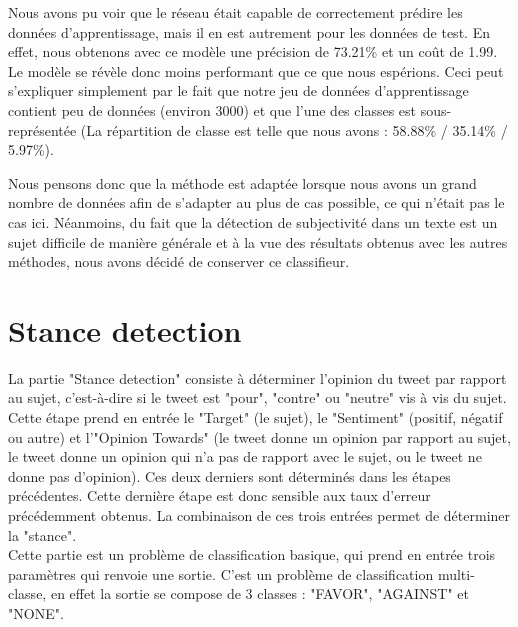 \par Nous avons pu voir que le réseau était capable de correctement prédire les données d'apprentissage, mais il en est autrement pour les données de test. En effet, nous obtenons avec ce modèle une précision de 73.21\% et un coût de 1.99. Le modèle se révèle donc moins performant que ce que nous espérions. Ceci peut s'expliquer simplement par le fait que notre jeu de données d'apprentissage contient peu de données (environ 3000) et que l'une des classes est sous-représentée (La répartition de classe est telle que nous avons : 58.88\% / 35.14\% / 5.97\%).

\par Nous pensons donc que la méthode est adaptée lorsque nous avons un grand nombre de données afin de s'adapter au plus de cas possible, ce qui n'était pas le cas ici. Néanmoins, du fait que la détection de subjectivité dans un texte est un sujet difficile de manière générale et à la vue des résultats obtenus avec les autres méthodes, nous avons décidé de conserver ce classifieur.


\section{Stance detection}

La partie "Stance detection" consiste à déterminer l'opinion du tweet par rapport au sujet, c'est-à-dire si le tweet est "pour", "contre" ou "neutre" vis à vis du sujet. Cette étape prend en entrée le "Target" (le sujet), le "Sentiment" (positif, négatif ou autre) et l'"Opinion Towards" (le tweet donne un opinion par rapport au sujet, le tweet donne un opinion qui n'a pas de rapport avec le sujet, ou le tweet ne donne pas d'opinion). Ces deux derniers sont déterminés dans les étapes précédentes. Cette dernière étape est donc sensible aux taux d'erreur précédemment obtenus.
La combinaison de ces trois entrées permet de déterminer la "stance". \\

Cette partie est un problème de classification basique, qui prend en entrée trois paramètres qui renvoie une sortie. C'est un problème de classification multi-classe, en effet la sortie se compose de 3 classes : "FAVOR", "AGAINST" et "NONE". \\

